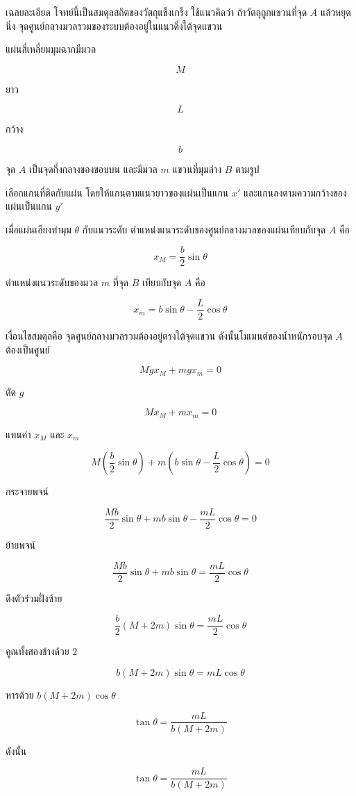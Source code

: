 \begin{examplebox}{เฉลยละเอียด}
โจทย์นี้เป็นสมดุลสถิตของวัตถุแข็งเกร็ง ใช้แนวคิดว่า ถ้าวัตถุถูกแขวนที่จุด \(A\) แล้วหยุดนิ่ง จุดศูนย์กลางมวลรวมของระบบต้องอยู่ในแนวดิ่งใต้จุดแขวน

แผ่นสี่เหลี่ยมมุมฉากมีมวล

\[
M
\]

ยาว

\[
L
\]

กว้าง

\[
b
\]

จุด \(A\) เป็นจุดกึ่งกลางของขอบบน และมีมวล \(m\) แขวนที่มุมล่าง \(B\) ตามรูป

เลือกแกนที่ติดกับแผ่น โดยให้แกนตามแนวยาวของแผ่นเป็นแกน \(x'\) และแกนลงตามความกว้างของแผ่นเป็นแกน \(y'\)

เมื่อแผ่นเอียงทำมุม \(\theta\) กับแนวระดับ ตำแหน่งแนวระดับของศูนย์กลางมวลของแผ่นเทียบกับจุด \(A\) คือ

\[
x_M=\frac{b}{2}\sin\theta
\]

ตำแหน่งแนวระดับของมวล \(m\) ที่จุด \(B\) เทียบกับจุด \(A\) คือ

\[
x_m=b\sin\theta-\frac{L}{2}\cos\theta
\]

เงื่อนไขสมดุลคือ จุดศูนย์กลางมวลรวมต้องอยู่ตรงใต้จุดแขวน ดังนั้นโมเมนต์ของน้ำหนักรอบจุด \(A\) ต้องเป็นศูนย์

\[
Mgx_M+mgx_m=0
\]

ตัด \(g\)

\[
Mx_M+mx_m=0
\]

แทนค่า \(x_M\) และ \(x_m\)

\[
M\left(\frac{b}{2}\sin\theta\right)
+
m\left(b\sin\theta-\frac{L}{2}\cos\theta\right)
=0
\]

กระจายพจน์

\[
\frac{Mb}{2}\sin\theta
+
mb\sin\theta
-
\frac{mL}{2}\cos\theta
=0
\]

ย้ายพจน์

\[
\frac{Mb}{2}\sin\theta
+
mb\sin\theta
=
\frac{mL}{2}\cos\theta
\]

ดึงตัวร่วมฝั่งซ้าย

\[
\frac{b}{2}(M+2m)\sin\theta
=
\frac{mL}{2}\cos\theta
\]

คูณทั้งสองข้างด้วย \(2\)

\[
b(M+2m)\sin\theta
=
mL\cos\theta
\]

หารด้วย \(b(M+2m)\cos\theta\)

\[
\tan\theta
=
\frac{mL}{b(M+2m)}
\]

ดังนั้น

\[
\boxed{
\tan\theta=\frac{mL}{b(M+2m)}
}
\]
\end{examplebox}